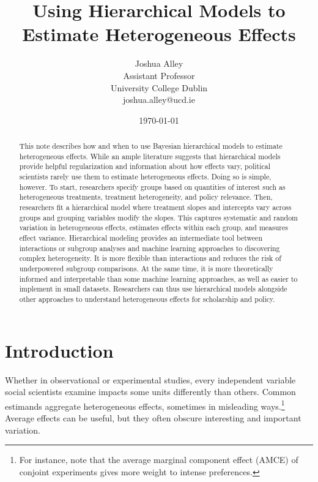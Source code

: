 \documentclass[12pt]{article}
\title{\textbf{Using Hierarchical Models to Estimate Heterogeneous Effects}}
\author{Joshua Alley \\
Assistant Professor \\
University College Dublin \\
joshua.alley@ucd.ie
}
\date{\today}
\begin{document}
\maketitle 

\begin{abstract} 
This note describes how and when to use Bayesian hierarchical models to estimate heterogeneous effects. 
While an ample literature suggests that hierarchical models provide helpful regularization and information about how effects vary, political scientists rarely use them to estimate heterogeneous effects. 
Doing so is simple, however. 
To start, researchers specify groups based on quantities of interest such as heterogeneous treatments, treatment heterogeneity, and policy relevance.  
Then, researchers fit a hierarchical model where treatment slopes and intercepts vary across groups and grouping variables modify the slopes.
This captures systematic and random variation in heterogeneous effects, estimates effects within each group, and measures effect variance. 
Hierarchical modeling provides an intermediate tool between interactions or subgroup analyses and machine learning approaches to discovering complex heterogeneity. 
It is more flexible than interactions and reduces the risk of underpowered subgroup comparisons.
At the same time, it is more theoretically informed and interpretable than some machine learning approaches, as well as easier to implement in small datasets. 
Researchers can thus use hierarchical models alongside other approaches to understand heterogeneous effects for scholarship and policy.
\end{abstract} 


\newpage 
\doublespace 


\section{Introduction}


Whether in observational or experimental studies, every independent variable social scientists examine impacts some units differently than others. 
Common estimands aggregate heterogeneous effects, sometimes in misleading ways.\footnote{For instance, \citet{Abramsonetal2022} note that the average marginal component effect (AMCE) of conjoint experiments gives more weight to intense preferences.} 
Average effects can be useful, but they often obscure interesting and important variation. 
\end{document}
